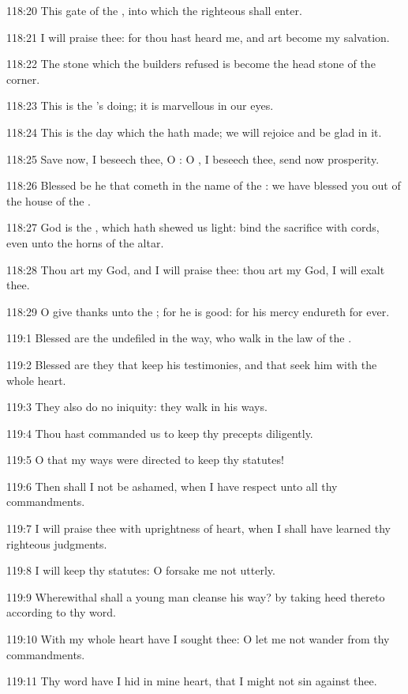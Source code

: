 118:20 This gate of the \LORD, into which the righteous shall enter.

118:21 I will praise thee: for thou hast heard me, and art become my
salvation.

118:22 The stone which the builders refused is become the head stone
of the corner.

118:23 This is the \LORD's doing; it is marvellous in our eyes.

118:24 This is the day which the \LORD hath made; we will rejoice and
be glad in it.

118:25 Save now, I beseech thee, O \LORD: O \LORD, I beseech thee, send
now prosperity.

118:26 Blessed be he that cometh in the name of the \LORD: we have
blessed you out of the house of the \LORD.

118:27 God is the \LORD, which hath shewed us light: bind the sacrifice
with cords, even unto the horns of the altar.

118:28 Thou art my God, and I will praise thee: thou art my God, I
will exalt thee.

118:29 O give thanks unto the \LORD; for he is good: for his mercy
endureth for ever.



119:1 Blessed are the undefiled in the way, who walk in the law of the
\LORD.

119:2 Blessed are they that keep his testimonies, and that seek him
with the whole heart.

119:3 They also do no iniquity: they walk in his ways.

119:4 Thou hast commanded us to keep thy precepts diligently.

119:5 O that my ways were directed to keep thy statutes!

119:6 Then shall I not be ashamed, when I have respect unto all thy
commandments.

119:7 I will praise thee with uprightness of heart, when I shall have
learned thy righteous judgments.

119:8 I will keep thy statutes: O forsake me not utterly.

119:9 Wherewithal shall a young man cleanse his way? by taking heed
thereto according to thy word.

119:10 With my whole heart have I sought thee: O let me not wander
from thy commandments.

119:11 Thy word have I hid in mine heart, that I might not sin against
thee.

